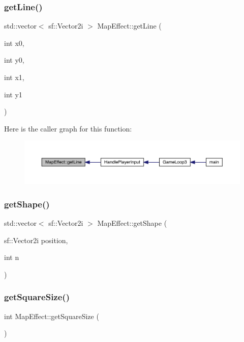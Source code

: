 \subsubsection{\texorpdfstring{get\+Line()}{getLine()}}
{\footnotesize\ttfamily std\+::vector$<$ sf\+::\+Vector2i $>$ Map\+Effect\+::get\+Line (\begin{DoxyParamCaption}\item[{int}]{x0,  }\item[{int}]{y0,  }\item[{int}]{x1,  }\item[{int}]{y1 }\end{DoxyParamCaption})}

Here is the caller graph for this function\+:
\nopagebreak
\begin{figure}[H]
\begin{center}
\leavevmode
\includegraphics[width=350pt]{de/de4/class_map_effect_a7aeebd5eef57c00feabca583a38c5361_icgraph}
\end{center}
\end{figure}
\mbox{\label{class_map_effect_a4557d94941b97471dce7ac47e30825c5}} 
\subsubsection{\texorpdfstring{get\+Shape()}{getShape()}}
{\footnotesize\ttfamily std\+::vector$<$ sf\+::\+Vector2i $>$ Map\+Effect\+::get\+Shape (\begin{DoxyParamCaption}\item[{sf\+::\+Vector2i}]{position,  }\item[{int}]{n }\end{DoxyParamCaption})}

\mbox{\label{class_map_effect_aa96fb614319095fdc9003d85ea4647e2}} 
\subsubsection{\texorpdfstring{get\+Square\+Size()}{getSquareSize()}}
{\footnotesize\ttfamily int Map\+Effect\+::get\+Square\+Size (\begin{DoxyParamCaption}{ }\end{DoxyParamCaption})}

